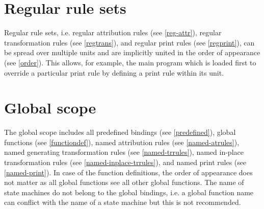 \section{Regular rule sets}
Regular rule sets, i.e. regular attribution rules (see \ref{reg-attr}),
regular transformation rules (see \ref{regtrans}), and
regular print rules (see \ref{regprint}), can be spread over
multiple units and are implicitly united in the order of appearance
(see \ref{order}). This allows, for example, the main program which
is loaded first to override a particular print rule by defining
a print rule within its unit.

\section{Global scope}

The global scope includes all predefined bindings (see \ref{predefined}),
global functions (see \ref{functiondef}), named attribution rules
(see \ref{named-atrules}), named generating transformation rules (see
\ref{named-trrules}), named in-place transformation rules
(see \ref{named-inplace-trrules}), and named print rules
(see \ref{named-print}). In case of the function definitions,
the order of appearance does not matter as all global functions see all
other global functions.  The name of state machines do not belong to
the global bindings, i.e. a global function name can conflict with the
name of a state machine but this is not recommended.

\endinput
